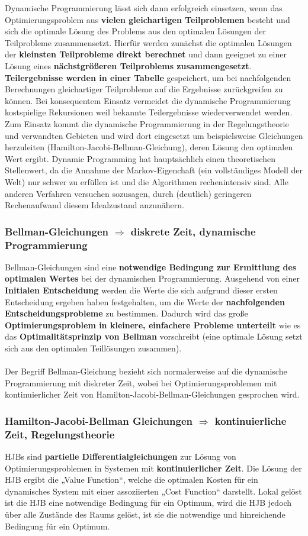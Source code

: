 \documentclass[10pt]{scrartcl}
\begin{document}
Dynamische Programmierung lässt sich dann erfolgreich einsetzen, wenn das Optimierungsproblem aus \textbf{vielen gleichartigen Teilproblemen} besteht und sich die optimale Lösung des Problems aus den optimalen Lösungen der Teilprobleme zusammensetzt. Hierfür werden zunächst die optimalen Lösungen der \textbf{kleinsten Teilprobleme direkt berechnet} und dann geeignet zu einer Lösung eines \textbf{nächstgrößeren Teilproblems zusammengesetzt}. \textbf{Teilergebnisse werden in einer Tabelle} gespeichert, um bei nachfolgenden Berechnungen gleichartiger Teilprobleme auf die Ergebnisse zurückgreifen zu können. Bei konsequentem Einsatz vermeidet die dynamische Programmierung kostspielige Rekursionen weil bekannte Teilergebnisse wiederverwendet werden.\\
Zum Einsatz kommt die dynamische Programmierung in der Regelungstheorie und verwandten Gebieten und wird dort eingesetzt um beispielsweise Gleichungen herzuleiten (Hamilton-Jacobi-Bellman-Gleichung), deren Lösung den optimalen Wert ergibt.
Dynamic Programming hat hauptsächlich einen theoretischen Stellenwert, da die Annahme der Markov-Eigenchaft
(ein vollständiges Modell der Welt) nur schwer zu erfüllen ist und die Algorithmen rechenintensiv
sind. Alle anderen Verfahren versuchen sozusagen, durch (deutlich) geringeren Rechenaufwand
diesem Idealzustand anzunähern. 

\subsubsection{Bellman-Gleichungen $\Rightarrow$ diskrete Zeit, dynamische Programmierung}
Bellman-Gleichungen sind eine \textbf{notwendige Bedingung zur Ermittlung des optimalen Wertes}  bei der dynamischen Programmierung. Ausgehend von einer \textbf{Initialen Entscheidung} werden die Werte die sich aufgrund dieser ersten Entscheidung ergeben haben festgehalten, um die Werte der \textbf{nachfolgenden Entscheidungsprobleme} zu bestimmen. Dadurch wird das große \textbf{Optimierungsproblem in kleinere, einfachere Probleme unterteilt} wie es das \textbf{Optimalitätsprinzip von Bellman} vorschreibt (eine optimale Lösung setzt sich aus den optimalen Teillösungen zusammen).\\
\\
Der Begriff Bellman-Gleichung bezieht sich normalerweise auf die dynamische Programmierung mit diskreter Zeit, wobei bei Optimierungsproblemen mit kontinuierlicher Zeit von Hamilton-Jacobi-Bellman-Gleichungen gesprochen wird.


\subsubsection{Hamilton-Jacobi-Bellman Gleichungen $\Rightarrow$ kontinuierliche  Zeit, Regelungstheorie}
HJBs sind \textbf{partielle Differentialgleichungen} zur Lösung von Optimierungsproblemen in Systemen mit \textbf{kontinuierlicher Zeit}. Die Lösung der HJB ergibt die „Value Function“, welche die optimalen Kosten für ein dynamisches System mit einer assoziierten „Cost Function“ darstellt. Lokal gelöst ist die HJB eine notwendige Bedingung für ein Optimum, wird die HJB jedoch über alle Zustände des Raums gelöst, ist sie die notwendige und hinreichende Bedingung für ein Optimum.
\end{document}
